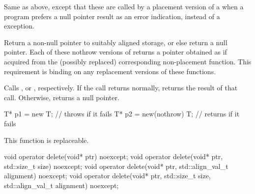 \begin{itemdescr}
\pnum
\effects
Same as above, except that these are called by a placement version of a
when a \Cpp{} program prefers a null pointer result as an error indication,
instead of a
exception.

\pnum
\required
Return a non-null pointer to suitably aligned storage,
or else return a null pointer.
Each of these nothrow versions of
returns a pointer obtained as if
acquired from the (possibly replaced)
corresponding non-placement function.
This requirement is binding on any replacement versions of these functions.

\pnum
{}
Calls ,
or ,
respectively.
If the call returns normally,
returns the result of that call.
Otherwise, returns a null pointer.

\pnum
\begin{example}
\begin{codeblock}
T* p1 = new T;                  // throws  if it fails
T* p2 = new(nothrow) T;         // returns  if it fails
\end{codeblock}
\end{example}

\pnum
\remarks
This function is replaceable.
\end{itemdescr}

%
\begin{itemdecl}
void operator delete(void* ptr) noexcept;
void operator delete(void* ptr, std::size_t size) noexcept;
void operator delete(void* ptr, std::align_val_t alignment) noexcept;
void operator delete(void* ptr, std::size_t size, std::align_val_t alignment) noexcept;
\end{itemdecl}

